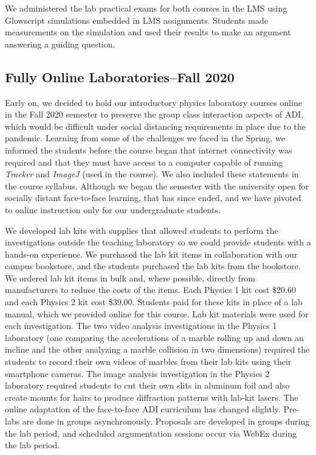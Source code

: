 \documentclass[aip, numerical, preprint]{revtex4-2}
\begin{document}
We administered the lab practical exams for both courses in the LMS using Glowscript
simulations embedded in LMS assignments. Students made measurements on the simulation and used
their results to make an argument answering a guiding question.

\subsection{Fully Online Laboratories--Fall 2020}

Early on, we decided to hold our introductory physics laboratory courses online in the Fall
2020 semester to preserve the group class interaction aspects of ADI, which would be difficult
under social distancing requirements in place due to the pandemic.\citep{mclber20} Learning
from some of the challenges we faced in the Spring, we informed the students before the course
began that internet connectivity was required and that they must have access to a computer
capable of running \emph{Tracker}\citep{bro2009} and \emph{ImageJ}\citep{schrasetal12} (used in
the course). We also included these statements in the course syllabus. Although we began the
semester with the university open for socially distant face-to-face learning, that has since
ended, and we have pivoted to online instruction only for our undergraduate students.

We developed lab kits with supplies that allowed students to perform the investigations outside
the teaching laboratory so we could provide students with a hands-on experience. We purchased
the lab kit items in collaboration with our campus bookstore, and the students purchased the
lab kits from the bookstore. We ordered lab kit items in bulk and, where possible, directly
from manufacturers to reduce the costs of the items. Each Physics 1 kit cost \$20.60 and each
Physics 2 kit cost \$39.00. Students paid for these kits in place of a lab manual, which we
provided online for this course. Lab kit materials were used for each investigation. The two
video analysis investigations in the Physics 1 laboratory (one comparing the accelerations of a
marble rolling up and down an incline and the other analyzing a marble collision in two
dimensions) required the students to record their own videos of marbles from their lab kits
using their smartphone cameras. The image analysis investigation in the Physics 2 laboratory
required students to cut their own slits in aluminum foil and also create mounts for hairs to
produce diffraction patterns with lab-kit lasers. The online adaptation of the face-to-face ADI
curriculum has changed slightly. Pre-labs are done in groups asynchronously.  Proposals are
developed in groups during the lab period, and scheduled argumentation sessions occur via WebEx
during the lab period.
\end{document}

